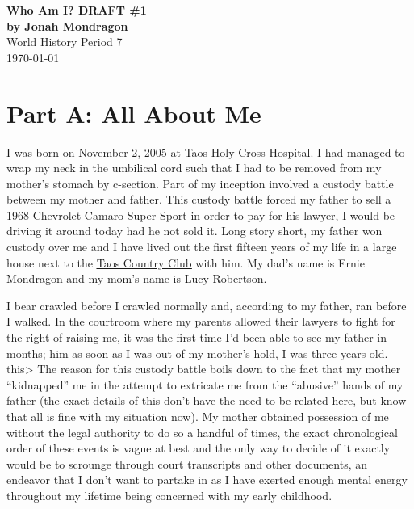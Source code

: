 \documentclass[12pt]{article}
\begin{document}
\doublespacing

\begin{titlepage}
    \begin{center}
        \vspace*{1.5in}
        {\huge\bfseries{Who Am I? DRAFT \#1}}\\
            {\bfseries{by Jonah Mondragon}}\\
            World History Period 7\\
            \today
    \end{center}
\end{titlepage}

\section*{Part A: All About Me}

I was born on November 2, 2005 at Taos Holy Cross Hospital.  I had managed to
wrap my neck in the umbilical cord such that I had to be removed from my
mother's stomach by c-section.  Part of my inception involved a custody battle
between my mother and father.  This custody battle forced my father to sell a
1968 Chevrolet Camaro Super Sport in order to pay for his lawyer, I would be
driving it around today had he not sold it.  Long story short, my father won
custody over me and I have lived out the first fifteen years of my life in a
large house next to the {\color{blue}
\underline{\href{https://www.taoscountryclub.com/}{Taos Country Club}}} with
him. My dad's name is Ernie Mondragon and my mom's name is Lucy Robertson.

I bear crawled before I crawled normally and, according to my father, ran before
I walked.  In the courtroom where my parents allowed their lawyers to fight for
the right of raising me, it was the first time I'd been able to see my father in
months; %
him as soon as I was out of my mother's hold, I was three years old. %
this> The reason for this custody battle boils down to the fact that my mother
``kidnapped'' me in the attempt to extricate me from the ``abusive'' hands of my
father (the exact details of this don't have the need to be related here, but
know that all is fine with my situation now).  My mother obtained possession of
me without the legal authority to do so a handful of times, the exact
chronological order of these events is vague at best and the only way to decide
of it exactly would be to scrounge through court transcripts and other
documents, an endeavor that I don't want to partake in as I have exerted enough
mental energy throughout my lifetime being concerned with my early childhood.
\end{document}
